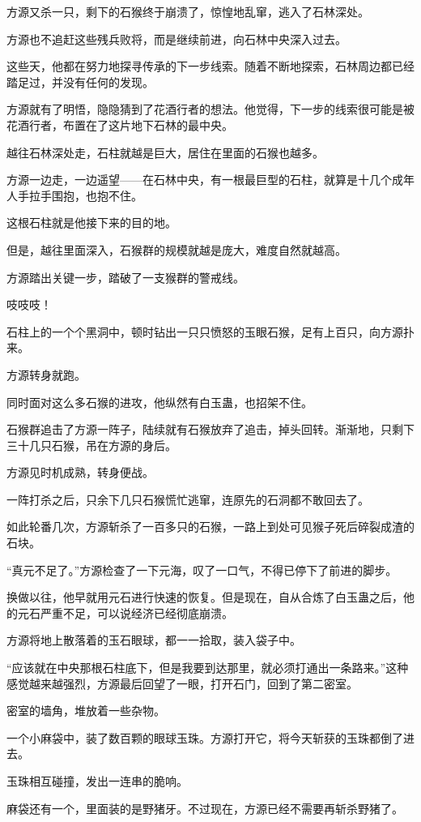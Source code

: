\begin{this_body}
方源又杀一只，剩下的石猴终于崩溃了，惊惶地乱窜，逃入了石林深处。

方源也不追赶这些残兵败将，而是继续前进，向石林中央深入过去。

这些天，他都在努力地探寻传承的下一步线索。随着不断地探索，石林周边都已经踏足过，并没有任何的发现。

方源就有了明悟，隐隐猜到了花酒行者的想法。他觉得，下一步的线索很可能是被花酒行者，布置在了这片地下石林的最中央。

越往石林深处走，石柱就越是巨大，居住在里面的石猴也越多。

方源一边走，一边遥望——在石林中央，有一根最巨型的石柱，就算是十几个成年人手拉手围抱，也抱不住。

这根石柱就是他接下来的目的地。

但是，越往里面深入，石猴群的规模就越是庞大，难度自然就越高。

方源踏出关键一步，踏破了一支猴群的警戒线。

吱吱吱！

石柱上的一个个黑洞中，顿时钻出一只只愤怒的玉眼石猴，足有上百只，向方源扑来。

方源转身就跑。

同时面对这么多石猴的进攻，他纵然有白玉蛊，也招架不住。

石猴群追击了方源一阵子，陆续就有石猴放弃了追击，掉头回转。渐渐地，只剩下三十几只石猴，吊在方源的身后。

方源见时机成熟，转身便战。

一阵打杀之后，只余下几只石猴慌忙逃窜，连原先的石洞都不敢回去了。

如此轮番几次，方源斩杀了一百多只的石猴，一路上到处可见猴子死后碎裂成渣的石块。

“真元不足了。”方源检查了一下元海，叹了一口气，不得已停下了前进的脚步。

换做以往，他早就用元石进行快速的恢复。但是现在，自从合炼了白玉蛊之后，他的元石严重不足，可以说经济已经彻底崩溃。

方源将地上散落着的玉石眼球，都一一拾取，装入袋子中。

“应该就在中央那根石柱底下，但是我要到达那里，就必须打通出一条路来。”这种感觉越来越强烈，方源最后回望了一眼，打开石门，回到了第二密室。

密室的墙角，堆放着一些杂物。

一个小麻袋中，装了数百颗的眼球玉珠。方源打开它，将今天斩获的玉珠都倒了进去。

玉珠相互碰撞，发出一连串的脆响。

麻袋还有一个，里面装的是野猪牙。不过现在，方源已经不需要再斩杀野猪了。


\end{this_body}
